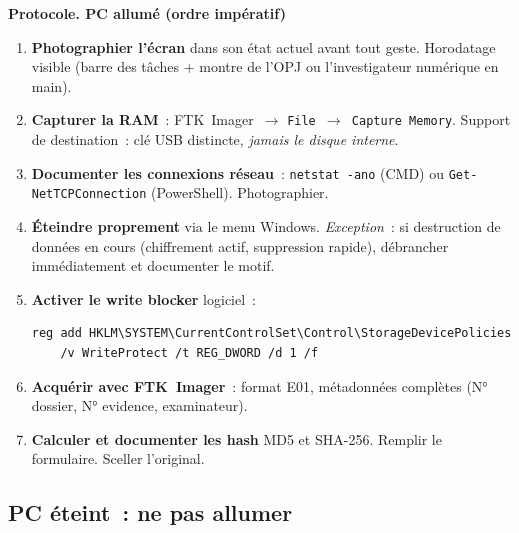 \begin{boxPNC}
\textbf{Protocole. PC allumé (ordre impératif)}

\begin{enumerate}
    \item \textbf{Photographier l'écran} dans son état actuel avant tout geste.
          Horodatage visible (barre des tâches + montre de l'OPJ ou l'investigateur numérique en main).
    \item \textbf{Capturer la RAM}~: FTK~Imager~$\to$
          \texttt{File~$\to$~Capture Memory}. Support de destination~:
          clé USB distincte, \emph{jamais le disque interne}.
    \item \textbf{Documenter les connexions réseau}~: \texttt{netstat -ano}
          (CMD) ou \texttt{Get-NetTCPConnection} (PowerShell). Photographier.
    \item \textbf{Éteindre proprement} via le menu Windows.
          \emph{Exception}~: si destruction de données en cours
          (chiffrement actif, suppression rapide), débrancher immédiatement
          et documenter le motif.
    \item \textbf{Activer le write blocker} logiciel~:
          \begin{lstlisting}[language=bash_forensique]
reg add HKLM\SYSTEM\CurrentControlSet\Control\StorageDevicePolicies
    /v WriteProtect /t REG_DWORD /d 1 /f
          \end{lstlisting}
    \item \textbf{Acquérir avec FTK~Imager}~: format E01, métadonnées
          complètes (N° dossier, N° evidence, examinateur).
    \item \textbf{Calculer et documenter les hash} MD5 et SHA-256.
          Remplir le formulaire. Sceller l'original.
\end{enumerate}
\end{boxPNC}

\subsection{PC éteint~: ne pas allumer}

